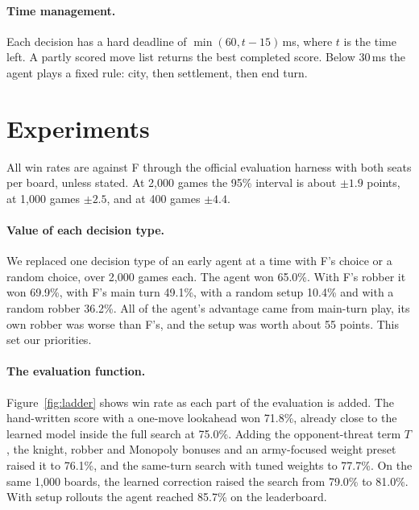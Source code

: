 \documentclass[11pt,a4paper]{article}
\begin{document}
\paragraph{Time management.} Each decision has a hard deadline of $\min(60, t-15)$\,ms, where $t$ is the time left.
A partly scored move list returns the best completed score. Below 30\,ms the agent plays a fixed rule: city, then
settlement, then end turn.

\section{Experiments}\label{sec:exp}
All win rates are against F through the official evaluation harness with both seats per board, unless stated.
At 2,000 games the 95\% interval is about $\pm1.9$ points, at 1,000 games $\pm2.5$, and at 400 games $\pm4.4$.

\paragraph{Value of each decision type.} We replaced one decision type of an early agent at a time with F's choice
or a random choice, over 2,000 games each. The agent won 65.0\%. With F's robber it won 69.9\%, with F's main turn
49.1\%, with a random setup 10.4\% and with a random robber 36.2\%. All of the agent's advantage came from main-turn
play, its own robber was worse than F's, and the setup was worth about 55 points. This set our priorities.

\paragraph{The evaluation function.} Figure~\ref{fig:ladder} shows win rate as each part of the evaluation is added.
The hand-written score with a one-move lookahead won 71.8\%, already close to the learned model inside the full
search at 75.0\%. Adding the opponent-threat term $T$, the knight, robber and Monopoly bonuses and an army-focused weight preset
raised it to 76.1\%, and the same-turn search with tuned weights to 77.7\%. On the same 1,000 boards, the learned
correction raised the search from 79.0\% to 81.0\%. With setup rollouts the agent reached 85.7\% on the leaderboard.
\end{document}
